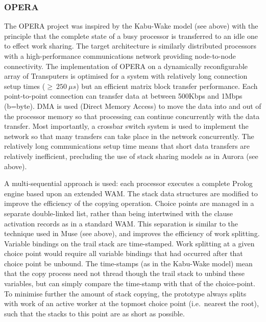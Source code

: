 
\subsubsection{OPERA}

The OPERA project \cite{B+92} was inspired by the Kabu-Wake model (see above) with the
principle that the complete state of a busy processor is transferred to an idle one
to effect work sharing.  The target architecture is similarly distributed processors with
a high-performance communications network providing node-to-node connectivity.  The
implementation of OPERA on a dynamically reconfigurable array of Transputers is optimised
for a system with relatively long connection setup times ($\geq\ 250\ \mu s$) but an
efficient matrix block transfer performance. Each point-to-point connection can transfer
data at between 500Kbps and 1Mbps (b=byte).  DMA is used (Direct Memory Access) to move
the data into and out of the processor memory so that processing can continue
concurrently with the data transfer.
Most importantly, a crossbar switch system is used to implement the network so that many
transfers can take place in the network concurrently.  The relatively long communications
setup time means that short data transfers are relatively inefficient, precluding the
use of stack sharing models as in Aurora (see above).

A multi-sequential approach is used: each processor executes a complete Prolog engine based
upon an extended WAM.  The stack data structures are modified to improve the
efficiency of the copying operation.
Choice points are managed in a separate double-linked list,  rather than
being intertwined with the clause activation records as in a standard WAM.  This separation is
similar to the technique used in Muse (see above), and improves the efficiency of work splitting.
Variable bindings on the trail stack are time-stamped.  Work splitting at a given choice point
would require all variable bindings that had occurred after that choice point be unbound.  The
time-stamps (as in the Kabu-Wake model) mean that the copy process need not thread though the
trail stack to unbind these variables, but can simply compare the time-stamp with that of
the choice-point.  To minimise further the amount of stack copying, the prototype always splits
with work of an active worker at the topmost choice point (i.e.\ nearest the root), such that the
stacks to this point are as short as possible.

